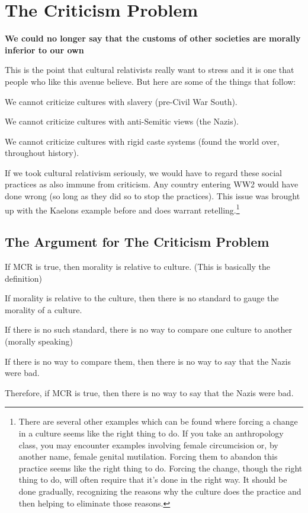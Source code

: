 \section{The Criticism Problem}

\begin{center}
\textbf{We could no longer say that the customs of other societies are morally inferior to our own}
\end{center}

This is the point that cultural relativists really want to stress and it is one that people who like this avenue believe. But here are some of the things that follow:
\begin{earg}
    \item[]We cannot criticize cultures with slavery (pre-Civil War South).
    \item[]We cannot criticize cultures with anti-Semitic views (the Nazis).
    \item[]We cannot criticize cultures with rigid caste systems (found the world over, throughout history). 
\end{earg}
If we took cultural relativism seriously, we would have to regard these social practices as also immune from criticism. Any country entering WW2 would have done wrong (so long as they did so to stop the practices). This issue was brought up with the Kaelons example before and does warrant retelling.\footnote{There are several other examples which can be found where forcing a change in a culture seems like the right thing to do. If you take an anthropology class, you may encounter examples involving female circumcision or, by another name, female genital mutilation. Forcing them to abandon this practice seems like the right thing to do. Forcing the change, though the right thing to do, will often require that it's done in the right way. It should be done gradually, recognizing the reasons why the culture does the practice and then helping to eliminate those reasons.}

\subsection{The Argument for The Criticism Problem}

\begin{earg}
    \item[1] If MCR is true, then morality is relative to culture. (This is basically the definition)
    \item[2] If morality is relative to the culture, then there is no standard to gauge the morality of a culture.
    \item[3] If there is no such standard, there is no way to compare one culture to another (morally speaking)
    \item[4] If there is no way to compare them, then there is no way to say that the Nazis were bad.
    \item[5] Therefore, if MCR is true, then there is no way to say that the Nazis were bad.
\end{earg}

